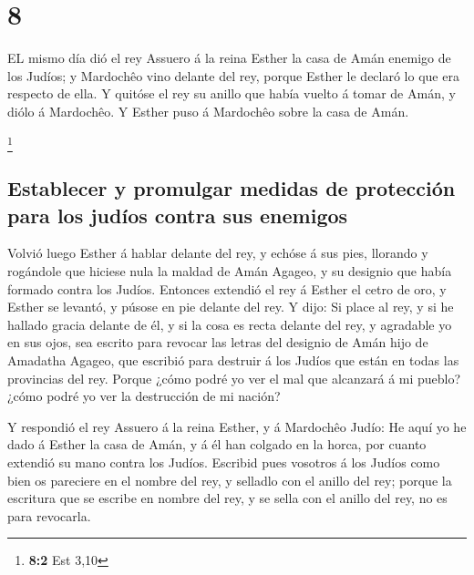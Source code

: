 \hypertarget{section-7}{%
\section{8}\label{section-7}}

 EL mismo día dió el rey Assuero á la reina Esther la casa
de Amán enemigo de los Judíos; y Mardochêo vino delante del rey, porque
Esther le declaró lo que era respecto de ella.  Y quitóse
el rey su anillo que había vuelto á tomar de Amán, y diólo á Mardochêo.
Y Esther puso á Mardochêo sobre la casa de Amán.

\footnote{\textbf{8:2} Est 3,10}

\hypertarget{establecer-y-promulgar-medidas-de-protecciuxf3n-para-los-juduxedos-contra-sus-enemigos}{%
\subsection{Establecer y promulgar medidas de protección para los judíos
contra sus
enemigos}\label{establecer-y-promulgar-medidas-de-protecciuxf3n-para-los-juduxedos-contra-sus-enemigos}}

 Volvió luego Esther á hablar delante del rey, y echóse á
sus pies, llorando y rogándole que hiciese nula la maldad de Amán
Agageo, y su designio que había formado contra los Judíos.
 Entonces extendió el rey á Esther el cetro de oro, y
Esther se levantó, y púsose en pie delante del rey.  Y
dijo: Si place al rey, y si he hallado gracia delante de él, y si la
cosa es recta delante del rey, y agradable yo en sus ojos, sea escrito
para revocar las letras del designio de Amán hijo de Amadatha Agageo,
que escribió para destruir á los Judíos que están en todas las
provincias del rey.  Porque ¿cómo podré yo ver el mal que
alcanzará á mi pueblo? ¿cómo podré yo ver la destrucción de mi nación?

 Y respondió el rey Assuero á la reina Esther, y á
Mardochêo Judío: He aquí yo he dado á Esther la casa de Amán, y á él han
colgado en la horca, por cuanto extendió su mano contra los Judíos.
 Escribid pues vosotros á los Judíos como bien os
pareciere en el nombre del rey, y selladlo con el anillo del rey; porque
la escritura que se escribe en nombre del rey, y se sella con el anillo
del rey, no es para revocarla.

